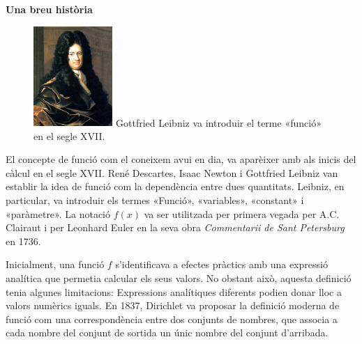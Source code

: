 
 \vspace*{\fill}
 
\begin{blueshaded}
	
	{\Large \textbf{Una breu història}}
	
	
	\begin{figure}
		\begin{center}
		\includegraphics[width=3cm]{img-05/leibniz.jpg}	
		{\footnotesize
		Gottfried Leibniz va introduir el terme «funció» en el segle XVII.}
		\end{center}
	\end{figure}
	El concepte de funció com el coneixem avui en dia, va aparèixer amb als inicis del càlcul en el segle XVII. René Descartes, Isaac Newton i Gottfried Leibniz van establir la idea de funció com la dependència entre dues quantitats. Leibniz, en particular, va introduir els termes «Funció», «variables», «constant» i «paràmetre». La notació $f(x)$ va ser utilitzada per primera vegada per A.C. Clairaut i per Leonhard Euler en la seva obra {\normalfont \textit{Commentarii de Sant Petersburg}} en 1736.
	
	Inicialment, una funció $f$ s'identificava a efectes pràctics amb una expressió analítica que permetia calcular els seus valors. No obstant això, aquesta definició tenia algunes limitacions: Expressions analítiques diferents podien donar lloc a valors numèrics iguals. En 1837, Dirichlet va proposar la definició moderna de funció com una correspondència entre dos conjunts de nombres, que associa a cada nombre del conjunt de sortida un únic nombre del conjunt d'arribada.
	 
\end{blueshaded}


